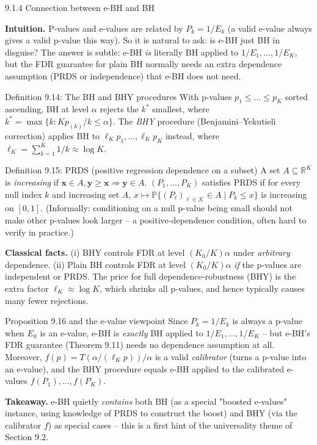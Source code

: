 \documentclass[aspectratio=169,10pt]{beamer}
\newcommand{\Kc}{\mathcal{K}}
\begin{document}
\begin{frame}[allowframebreaks]{9.1.4 Connection between e-BH and BH}

\textbf{Intuition.} P-values and e-values are related by $P_k = 1/E_k$ (a valid e-value always gives a valid p-value this way). So it is natural to ask: is e-BH just BH in disguise? The answer is subtle: e-BH \emph{is} literally BH applied to $1/E_1,\dots,1/E_K$, but the FDR guarantee for plain BH normally needs an extra dependence assumption (PRDS or independence) that e-BH does not need.

\begin{block}{Definition 9.14: The BH and BHY procedures}
With p-values $p_1\le\dots\le p_K$ sorted ascending, BH at level $\alpha$ rejects the $k^\ast$ smallest, where $k^\ast = \max\{k : Kp_{(k)}/k \le \alpha\}$. The \emph{BHY} procedure (Benjamini--Yekutieli correction) applies BH to $\ell_K p_1,\dots,\ell_K p_K$ instead, where $\ell_K = \sum_{k=1}^K 1/k \approx \log K$.
\end{block}

\begin{block}{Definition 9.15: PRDS (positive regression dependence on a subset)}
A set $A\subseteq\mathbb{R}^K$ is \emph{increasing} if $\mathbf{x}\in A, \mathbf{y}\ge\mathbf{x} \Rightarrow \mathbf{y}\in A$. $(P_1,\dots,P_K)$ satisfies PRDS if for every null index $k$ and increasing set $A$, $x\mapsto\mathbb{P}\{(P_\ell)_{\ell\in\Kc}\in A \mid P_k\le x\}$ is increasing on $[0,1]$. (Informally: conditioning on a null p-value being small should not make other p-values look larger -- a positive-dependence condition, often hard to verify in practice.)
\end{block}

\framebreak

\textbf{Classical facts.} (i) BHY controls FDR at level $(K_0/K)\alpha$ under \emph{arbitrary} dependence. (ii) Plain BH controls FDR at level $(K_0/K)\alpha$ \emph{if} the p-values are independent or PRDS. The price for full dependence-robustness (BHY) is the extra factor $\ell_K \approx \log K$, which shrinks all p-values, and hence typically causes many fewer rejections.

\begin{block}{Proposition 9.16 and the e-value viewpoint}
Since $P_k = 1/E_k$ is always a p-value when $E_k$ is an e-value, e-BH is \emph{exactly} BH applied to $1/E_1,\dots,1/E_K$ -- but e-BH's FDR guarantee (Theorem 9.11) needs no dependence assumption at all. Moreover, $f(p) = T(\alpha/(\ell_K p))/\alpha$ is a valid \emph{calibrator} (turns a p-value into an e-value), and the BHY procedure equals e-BH applied to the calibrated e-values $f(P_1),\dots,f(P_K)$.
\end{block}

\textbf{Takeaway.} e-BH quietly \emph{contains} both BH (as a special "boosted e-values" instance, using knowledge of PRDS to construct the boost) and BHY (via the calibrator $f$) as special cases -- this is a first hint of the universality theme of Section 9.2.

\end{frame}
\end{document}
